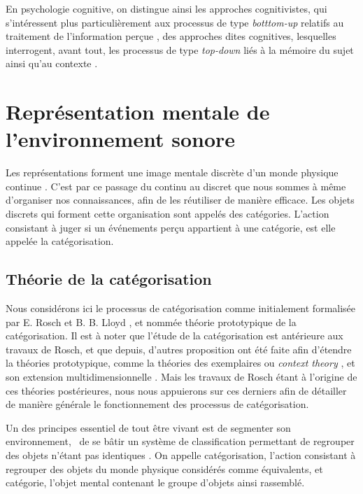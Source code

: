 En psychologie cognitive, on distingue ainsi les approches cognitivistes, qui s'intéressent plus particulièrement aux processus de type \emph{botttom-up} relatifs au traitement de l'information perçue , des approches dites cognitives, lesquelles interrogent, avant tout, les processus de type \emph{top-down} liés à la mémoire du sujet ainsi qu'au contexte \citep[p. ??]{guastavino_etude_2003}.

\section{Représentation mentale de l'environnement sonore}

Les représentations forment une image mentale discrète d'un monde physique continue \citep{houde1998vocabulaire}. C'est par ce passage du continu au discret que nous sommes à même d'organiser nos connaissances, afin de les réutiliser de manière efficace. Les objets discrets qui forment cette organisation sont appelés des catégories. L'action consistant à juger si un événements perçu appartient à une catégorie, est elle appelée la catégorisation.

\subsection{Théorie de la catégorisation}

Nous considérons ici le processus de catégorisation comme initialement formalisée par E. Rosch et B. B. Lloyd \citep{rosch1978cognition}, et nommée théorie prototypique de la catégorisation. Il est à noter que l'étude de la catégorisation est antérieure aux travaux de Rosch, et que depuis, d'autres proposition ont été faite afin d'étendre la théories prototypique, comme la théories des exemplaires ou \textit{context theory} \citep{medin1978context}, et son extension multidimensionnelle \citep{medin1978context}. Mais les travaux de Rosch étant à l'origine de ces théories postérieures, nous nous appuierons sur ces derniers afin de détailler de manière générale le fonctionnement des processus de catégorisation. 

Un des principes essentiel de tout être vivant est de segmenter son environnement, \ie~de se bâtir un système de classification permettant de regrouper des objets n'étant pas identiques \citep[p. 1]{rosch1978cognition}. On appelle catégorisation, l'action consistant à regrouper des objets du monde physique considérés comme équivalents, et catégorie, l'objet mental contenant le groupe d'objets ainsi rassemblé. 

